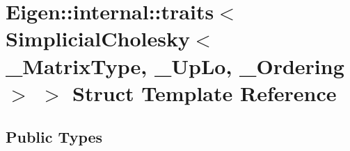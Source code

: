 \hypertarget{struct_eigen_1_1internal_1_1traits_3_01_simplicial_cholesky_3_01___matrix_type_00_01___up_lo_00_01___ordering_01_4_01_4}{}\section{Eigen\+:\+:internal\+:\+:traits$<$ Simplicial\+Cholesky$<$ \+\_\+\+Matrix\+Type, \+\_\+\+Up\+Lo, \+\_\+\+Ordering $>$ $>$ Struct Template Reference}
\label{struct_eigen_1_1internal_1_1traits_3_01_simplicial_cholesky_3_01___matrix_type_00_01___up_lo_00_01___ordering_01_4_01_4}
\subsection*{Public Types}
